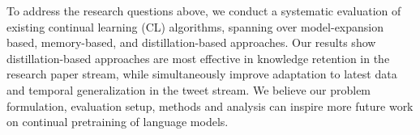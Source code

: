 


To address the research questions above, we conduct a systematic evaluation of existing continual learning (CL) algorithms, spanning over model-expansion based, memory-based, and distillation-based approaches. 
Our results show distillation-based approaches are most effective in knowledge retention in the research paper stream, while simultaneously improve adaptation to latest data and temporal generalization in the tweet stream.
We believe our problem formulation, evaluation setup, methods and analysis can inspire more future work on continual pretraining of language models.


